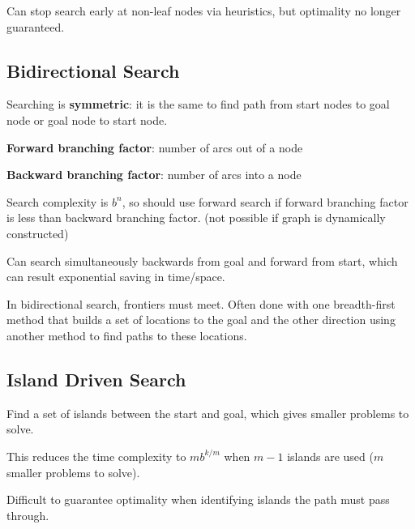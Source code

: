 \documentclass[11pt]{article}
\begin{document}
Can stop search early at non-leaf nodes via heuristics, but optimality no longer guaranteed.
\subsection{Bidirectional Search}
\label{sec:orgd8a8e10}
Searching is \textbf{symmetric}: it is the same to find path from start nodes to goal node or goal node
to start node.

\textbf{Forward branching factor}: number of arcs out of a node

\textbf{Backward branching factor}: number of arcs into a node

Search complexity is \(b^{n}\), so should use forward search if forward branching factor is less
than backward branching factor. (not possible if graph is dynamically constructed)

Can search simultaneously backwards from goal and forward from start, which can result exponential
saving in time/space.

In bidirectional search, frontiers must meet.
Often done with one breadth-first method that builds a set of locations to the goal and
the other direction using another method to find paths to these locations.
\subsection{Island Driven Search}
\label{sec:orgc0f5390}
Find a set of islands between the start and goal, which gives smaller problems to solve.

This reduces the time complexity to \(mb^{k/m}\) when \(m-1\) islands are used (\(m\) smaller problems to solve).

Difficult to guarantee optimality when identifying islands the path must pass through.
\end{document}
